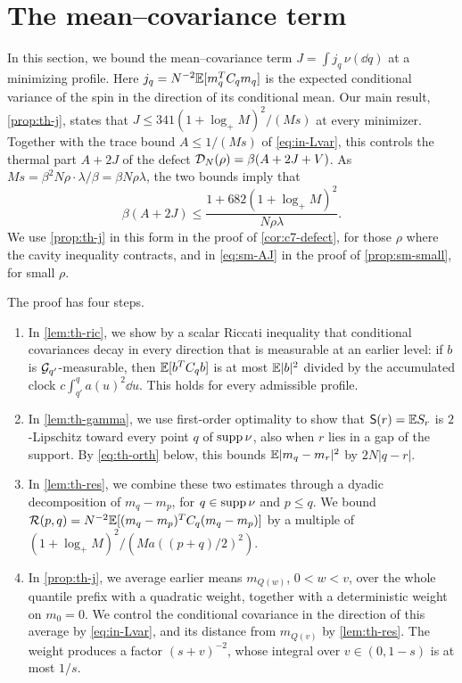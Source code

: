 \chapter{The mean--covariance term}\label{sec:th}

In this section, we bound the mean--covariance term
$J=\int j_q\,\nu(\dd q)$ at a minimizing profile. Here
$j_q=N^{-2}\mathbb E[m_q^TC_qm_q]$ is the expected conditional variance of the
spin in the direction of its conditional mean. Our main result,
\cref{prop:th-j}, states that $J\le341(1+\log_+M)^2/(Ms)$ at every
minimizer. Together with the trace bound $A\le1/(Ms)$ of
\eqref{eq:in-Lvar}, this controls the thermal part $A+2J$ of the defect
$\mathcal D_N(\rho)=\beta(A+2J+V)$. As
$Ms=\beta^2N\rho\cdot\lambda/\beta=\beta N\rho\lambda$, the two bounds
imply that
\[
 \beta(A+2J)\le\frac{1+682(1+\log_+M)^2}{N\rho\lambda}.
\]
We use \cref{prop:th-j} in this form in the proof of
\cref{cor:c7-defect}, for those $\rho$ where the cavity inequality
contracts, and in \eqref{eq:sm-AJ} in the proof of \cref{prop:sm-small},
for small $\rho$.

The proof has four steps.
\begin{enumerate}
\item In \cref{lem:th-ric}, we show by a scalar Riccati inequality that
conditional covariances decay in every direction that is measurable at
an earlier level: if $b$ is $\mathcal G_{q'}$-measurable, then
$\mathbb E[b^TC_qb]$ is at most $\mathbb E|b|^2$ divided by the accumulated clock
$c\int_{q'}^qa(u)^2\dd u$. This holds for every admissible profile.
\item In \cref{lem:th-gamma}, we use first-order optimality to show that
$\mathsf S(r)=\mathbb E S_r$ is $2$-Lipschitz toward every point $q$ of
$\operatorname{supp}\nu$, also when $r$ lies in a gap of the support. By
\eqref{eq:th-orth} below, this bounds $\mathbb E|m_q-m_r|^2$ by $2N|q-r|$.
\item In \cref{lem:th-res}, we combine these two estimates through a
dyadic decomposition of $m_q-m_p$, for $q\in\operatorname{supp}\nu$ and $p\le q$. We
bound $\mathcal R(p,q)=N^{-2}\mathbb E[(m_q-m_p)^TC_q(m_q-m_p)]$ by a multiple of
$(1+\log_+M)^2/(Ma((p+q)/2)^2)$.
\item In \cref{prop:th-j}, we average earlier means $m_{Q(w)}$, $0<w<v$,
over the whole quantile prefix with a quadratic weight, together with a
deterministic weight on $m_0=0$. We control the conditional covariance in the direction of this average by
\eqref{eq:in-Lvar}, and
its distance from $m_{Q(v)}$ by \cref{lem:th-res}. The weight produces a factor $(s+v)^{-2}$, whose
integral over $v\in(0,1-s)$ is at most $1/s$.
\end{enumerate}

